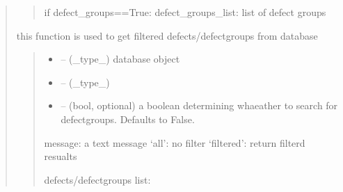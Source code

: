 \documentclass[letterpaper,10pt,english]{sphinxmanual}
\begin{document}
\begin{quote}
\begin{savenotes}
\begin{fulllineitems}
\begin{quote}
\begin{description}
\sphinxAtStartPar
if defect\_groups==True:
defect\_groups\_list: list of defect groups

\end{description}\end{quote}

\end{fulllineitems}\end{savenotes}


\begin{savenotes}\begin{fulllineitems}
\label{\detokenize{setting/backend/defect_management_funcs:oxin.backend.defect_management_funcs.get_filtered_defects_from_db}}
\pysigstartsignatures
{}
\pysigstopsignatures
\sphinxAtStartPar
this function is used to get filtered defects/defect\sphinxhyphen{}groups from database
\begin{quote}\begin{description}
\begin{itemize}
\item {} 
\sphinxAtStartPar
{} – (\_type\_) database object

\item {} 
\sphinxAtStartPar
{} – (\_type\_)

\item {} 
\sphinxAtStartPar
{} – (bool, optional) a boolean determining whaeather to search for defect\sphinxhyphen{}groups. Defaults to False.

\end{itemize}

\sphinxAtStartPar
message: a text message
‘all’: no filter
‘filtered’: return filterd resualts

\sphinxAtStartPar
defects/defect\sphinxhyphen{}groups list:


\end{description}
\end{quote}
\end{fulllineitems}
\end{savenotes}
\end{quote}
\end{document}
